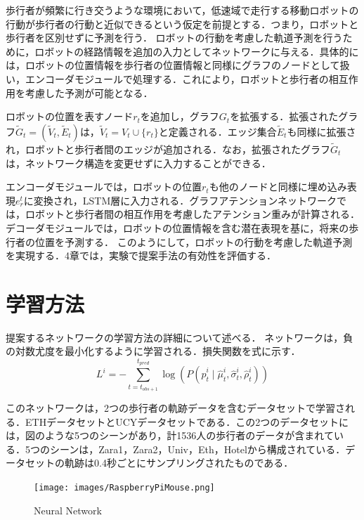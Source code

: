 歩行者が頻繁に行き交うような環境において，低速域で走行する移動ロボットの行動が歩行者の行動と近似できるという仮定を前提とする．つまり，ロボットと歩行者を区別せずに予測を行う．
ロボットの行動を考慮した軌道予測を行うために，ロボットの経路情報を追加の入力としてネットワークに与える．具体的には，ロボットの位置情報を歩行者の位置情報と同様にグラフのノードとして扱い，エンコーダモジュールで処理する．これにより，ロボットと歩行者の相互作用を考慮した予測が可能となる．

ロボットの位置を表すノード$r_t$を追加し，グラフ$G_t$を拡張する．拡張されたグラフ$\tilde{G}_t = (\tilde{V}_t, \tilde{E}_t)$は，$\tilde{V}_t = V_t \cup \{ r_t \}$と定義される．エッジ集合$\tilde{E}_t$も同様に拡張され，ロボットと歩行者間のエッジが追加される．なお，拡張されたグラフ$\tilde{G}_t$は，ネットワーク構造を変更せずに入力することができる．

エンコーダモジュールでは，ロボットの位置$r_t$も他のノードと同様に埋め込み表現$e^t_r$に変換され，LSTM層に入力される．グラフアテンションネットワークでは，ロボットと歩行者間の相互作用を考慮したアテンション重みが計算される．デコーダモジュールでは，ロボットの位置情報を含む潜在表現を基に，将来の歩行者の位置を予測する．
このようにして，ロボットの行動を考慮した軌道予測を実現する．4章では，実験で提案手法の有効性を評価する．

\section{学習方法}
提案するネットワークの学習方法の詳細について述べる．
ネットワークは，負の対数尤度を最小化するように学習される．損失関数を式に示す．
\begin{equation}
  L^i = -\sum_{t=t_{obs+1}}^{t_{pred}} \log \left( P(\hat{p}^i_t \mid \hat{\mu}^i_t, \hat{\sigma}^i_t, \hat{\rho}^i_t) \right)
\end{equation}

このネットワークは，2つの歩行者の軌跡データを含むデータセットで学習される．ETHデータセット\cite{pellegrini2009you-eth}とUCYデータセット\cite{lerner2007crowds-ucy}である．この2つのデータセットには，図のような5つのシーンがあり，計1536人の歩行者のデータが含まれている．5つのシーンは，Zara1，Zara2，Univ，Eth，Hotelから構成されている．データセットの軌跡は0.4秒ごとにサンプリングされたものである．

\begin{figure}[hbtp]
  \centering
 \texttt{[image: images/RaspberryPiMouse.png]}
 \caption{Neural Network}
 \label{Fig:hoge4}
\end{figure}

